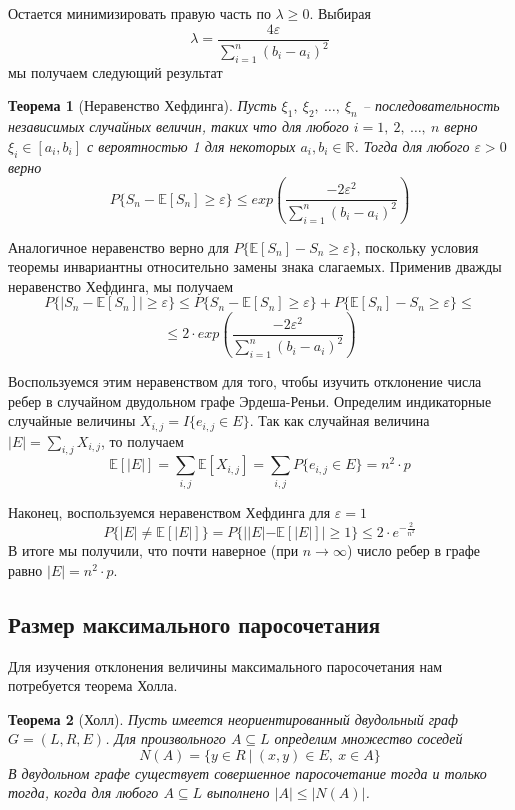 \documentclass[a4paper]{article}
\newtheorem*{mtheorem}{Теорема}
\begin{document}
Остается минимизировать правую часть по $\lambda \geq 0$. Выбирая $$\lambda = \frac{4\varepsilon}{\sum\limits_{i=1}^n(b_i-a_i)^2}$$ 
мы получаем следующий результат 
\begin{mtheorem}[Неравенство Хефдинга]
    Пусть $\xi_1,\ \xi_2,\ \dots,\ \xi_n$ -- последовательность независимых случайных величин, таких что 
для любого $i = 1,\ 2,\ \ldots,\ n$ верно $\xi_i \in [a_i, b_i]$ с вероятностью 1 для некоторых 
$a_i, b_i \in \mathbb{R}$. Тогда для любого $\varepsilon > 0$ верно $$P\{S_n - \mathbb{E}[S_n]\geq 
\varepsilon\} \leq exp\left(\frac{-2\varepsilon^2}{\sum\limits_{i=1}^n(b_i - a_i)^2}\right)$$
\end{mtheorem}

Аналогичное неравенство верно для $P\{\mathbb{E}[S_n] - S_n\geq \varepsilon\}$, поскольку условия теоремы 
инвариантны относительно замены знака слагаемых. Применив дважды неравенство Хефдинга, мы получаем 
$$P\{|S_n - \mathbb{E}[S_n]|\geq \varepsilon\} \leq P\{S_n - \mathbb{E}[S_n]\geq \varepsilon\} + 
P\{\mathbb{E}[S_n] - S_n\geq \varepsilon\} \leq $$ $$\leq 2\cdot exp\left(\frac{-2\varepsilon^2}{\sum\limits_{i=1}^n(b_i - a_i)^2}\right)$$

Воспользуемся этим неравенством для того, чтобы изучить отклонение числа ребер в случайном двудольном 
графе Эрдеша-Реньи. Определим индикаторные случайные величины $X_{i, j} = I\{e_{i,j}\in E\}$. Так как случайная 
величина $|E| = \sum\limits_{i,j}X_{i,j}$, то получаем $$\mathbb{E}[|E|] = \sum\limits_{i,j}\mathbb{E}[X_{i,j}] = 
\sum\limits_{i,j}P\{e_{i,j}\in E\} = n^2\cdot p$$

Наконец, воспользуемся неравенством Хефдинга для $\varepsilon = 1$ $$P\{|E| \neq \mathbb{E}[|E|]\} = 
P\{||E| - \mathbb{E}[|E|]|\geq 1\} \leq 2\cdot e^{-\frac{2}{n^2}}$$ В итоге мы получили, что почти 
наверное (при $n \rightarrow \infty$) число ребер в графе равно $|E| = n^2\cdot p$.


\subsection{Размер максимального паросочетания}

Для изучения отклонения величины максимального паросочетания нам потребуется теорема Холла.
\begin{mtheorem}[{Холл}]
    Пусть имеется неориентированный двудольный граф $G = (L, R, E)$. Для произвольного $A \subseteq L$ 
    определим множество соседей  $$N(A) = \{y\in R\ |\ (x, y) \in E,\ x\in A\}$$ В двудольном графе существует 
    совершенное паросочетание тогда и только тогда, когда для любого $A \subseteq L$ выполнено $|A| \leq |N(A)|$.
\end{mtheorem}
\end{document}
